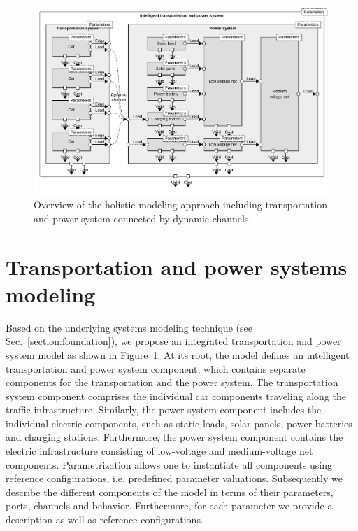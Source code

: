 \begin{figure}[b]
	\centering
	\includegraphics[width=\textwidth]{../gfx/model.pdf}
	\caption{Overview of the holistic modeling approach including transportation and power system connected by dynamic channels.}
	\label{fig:model}
\end{figure}

\section{Transportation and power systems modeling}
\label{section:contribution}

Based on the underlying systems modeling technique (see Sec.~\ref{section:foundation}), we propose an integrated transportation and power system model as shown in Figure~\ref{fig:model}. At its root, the model defines an intelligent transportation and power system component, which contains separate components for the transportation and the power system. The transportation system component comprises the individual car components traveling along the traffic infrastructure. Similarly, the power system component includes the individual electric components, such as static loads, solar panels, power batteries and charging stations. Furthermore, the power system component contains the electric infrastructure consisting of low-voltage and medium-voltage net components. Parametrization allows one to instantiate all components using reference configurations, i.e. predefined parameter valuations. Subsequently we describe the different components of the model in terms of their parameters, ports, channels and behavior. Furthermore, for each parameter we provide a description as well as reference configurations.


